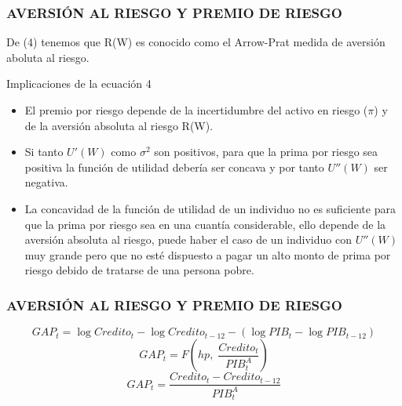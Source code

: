 \documentclass[10pt, xcolor=table, x11names]{beamer}
\begin{document}
\begin{frame}
    \frametitle{AVERSIÓN AL RIESGO Y PREMIO DE RIESGO}
    De (4) tenemos que R(W) es conocido como el Arrow-Prat medida de aversión aboluta al riesgo.\\
    
    \begin{block} {Implicaciones de la ecuación 4}
       \begin{itemize}
           \item El premio por riesgo depende de la incertidumbre del activo en riesgo ($\pi $) y de la aversión absoluta al riesgo R(W). 
           \item Si tanto $U'(W) $ como $\sigma^{2}$ son positivos, para que la prima por riesgo sea positiva la función de utilidad debería ser concava y por tanto  $U''(W) $ ser negativa.
           \item La concavidad de la función de utilidad de un individuo no es suficiente para que la prima por riesgo sea en una cuantía considerable, ello depende de la aversión absoluta al riesgo, puede haber el caso de un individuo con $U''(W) $ muy grande pero que no esté dispuesto a pagar un alto monto de prima por riesgo debido de tratarse de una persona pobre.
       \end{itemize} 
    \end{block}	
    
\end{frame}

\begin{frame}
\frametitle{AVERSIÓN AL RIESGO Y PREMIO DE RIESGO}

\begin{equation*}
GAP_{t}=\log{Credito_{t}}-\log{Credito_{t-12}}-(\log{PIB_{t}}-\log{PIB_{t-12}})
\end{equation*}
\begin{equation*}
GAP_{t}=F(hp, \; \frac{Credito_{t}}{PIB_{t}^{A}})
\end{equation*}
\begin{equation*}
GAP_{t}=\frac{Credito_{t}-Credito_{t-12}}{PIB_{t}^{A}}
\end{equation*}
\end{frame}
\end{document}
